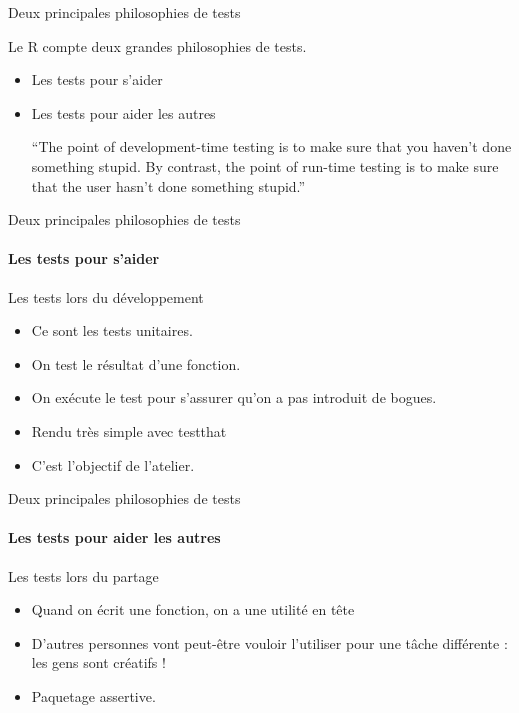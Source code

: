 \documentclass[11pt]{beamer}
\begin{document}
\begin{frame}{Deux principales philosophies de tests}

Le \textsf{R} compte deux grandes philosophies de tests. 

\begin{itemize}
\item Les tests pour s'aider
\item Les tests pour aider les autres
\begin{block}{}
{\large ``The point of development-time testing is to make sure that you
haven’t done something stupid. By contrast, the point of run-time
testing is to make sure that the user hasn’t done something stupid.''}
\vskip5mm
\hspace*{}
\end{block}

\end{itemize}
\end{frame}

\begin{frame}{Deux principales philosophies de tests}
\framesubtitle{Les tests pour s'aider}
Les tests lors du développement
\begin{itemize}
\item Ce sont les tests unitaires. %
\item On test le résultat d'une fonction. %
\item On exécute le test pour s'assurer qu'on a pas introduit de bogues. %
\item Rendu très simple avec testthat
\item C'est l'objectif de l'atelier.
\end{itemize}
\end{frame}

\begin{frame}{Deux principales philosophies de tests}
\framesubtitle{Les tests pour aider les autres}
Les tests lors du partage
\begin{itemize}
\item Quand on écrit une fonction, on a une utilité en tête
\item D'autres personnes vont peut-être vouloir l'utiliser pour une tâche différente : les gens sont créatifs !
\item Paquetage assertive. 
\end{itemize}
\end{frame}
\end{document}
